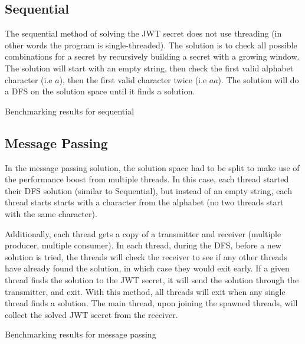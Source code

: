 \documentclass[12pt]{article}
\begin{document}
\subsection{Sequential}
The sequential method of solving the JWT secret does not use threading (in other words the program is single-threaded). The solution is to check all possible combinations for a secret by recursively building a secret with a growing window. The solution will start with an empty string, then check the first valid alphabet character (i.e $a$), then the first valid character twice (i.e $aa$). The solution will do a DFS on the solution space until it finds a solution.

\begin{table}
    \centering
    \caption{Benchmarking results for sequential}
    \label{table:sequential}
\end{table}

\subsection{Message Passing}
In the message passing solution, the solution space had to be split to make use of the performance boost from multiple threads. In this case, each thread started their DFS solution (similar to Sequential), but instead of an empty string, each thread starts starts with a character from the alphabet (no two threads start with the same character). 

Additionally, each thread gets a copy of a transmitter and receiver (multiple producer, multiple consumer). In each thread, during the DFS, before a new solution is tried, the threads will check the receiver to see if any other threads have already found the solution, in which case they would exit early. If a given thread finds the solution to the JWT secret, it will send the solution through the transmitter, and exit. With this method, all threads will exit when any single thread finds a solution. The main thread, upon joining the spawned threads, will collect the solved JWT secret from the receiver.

\begin{table}
    \centering
    \caption{Benchmarking results for message passing}
    \label{table:message-passing}
\end{table}
\end{document}
